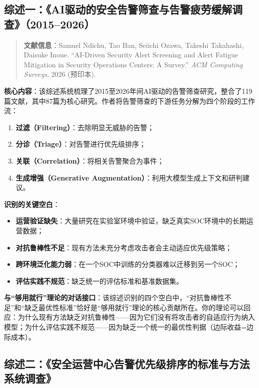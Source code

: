 \documentclass[11pt,a4paper]{article}
\begin{document}
\subsection{综述一：《AI驱动的安全告警筛查与告警疲劳缓解调查》（2015--2026）}

\begin{quote}
\textbf{文献信息}：Samuel Ndichu, Tao Ban, Seiichi Ozawa, Takeshi Takahashi, Daisuke Inoue. “AI-Driven Security Alert Screening and Alert Fatigue Mitigation in Security Operations Centers: A Survey.” \textit{ACM Computing Surveys}, 2026 (预印本).
\end{quote}

\textbf{核心内容}：该综述系统梳理了2015至2026年间AI驱动的告警筛查研究，整合了119篇文献，其中87篇为核心研究。作者将告警筛查的下游任务分解为四个阶段的工作流：

\begin{enumerate}[label=(\arabic*)]
    \item \textbf{过滤（Filtering）}：去除明显无威胁的告警；
    \item \textbf{分诊（Triage）}：对告警进行优先级排序；
    \item \textbf{关联（Correlation）}：将相关告警聚合为事件；
    \item \textbf{生成增强（Generative Augmentation）}：利用大模型生成上下文和研判建议。
\end{enumerate}

\textbf{识别的关键空白}：
\begin{itemize}
    \item \textbf{运营验证缺失}：大量研究在实验室环境中验证，缺乏真实SOC环境中的长期运营数据；
    \item \textbf{对抗鲁棒性不足}：现有方法未充分考虑攻击者会主动适应优先级策略；
    \item \textbf{跨环境泛化能力弱}：在一个SOC中训练的分类器难以迁移到另一个SOC；
    \item \textbf{评估实践不规范}：缺乏统一的评估标准和基准数据集。
\end{itemize}

\textbf{与“够用就行”理论的对话接口}：该综述识别的四个空白中，“对抗鲁棒性不足”和“缺乏最优性标准”恰好是“够用就行”理论的核心贡献所在。你的理论可以回应：为什么现有方法缺乏对抗鲁棒性——因为它们没有将攻击者的自适应行为纳入模型；为什么评估实践不规范——因为缺乏一个统一的最优性判据（边际收益=边际成本）。

\subsection{综述二：《安全运营中心告警优先级排序的标准与方法系统调查》}
\end{document}
